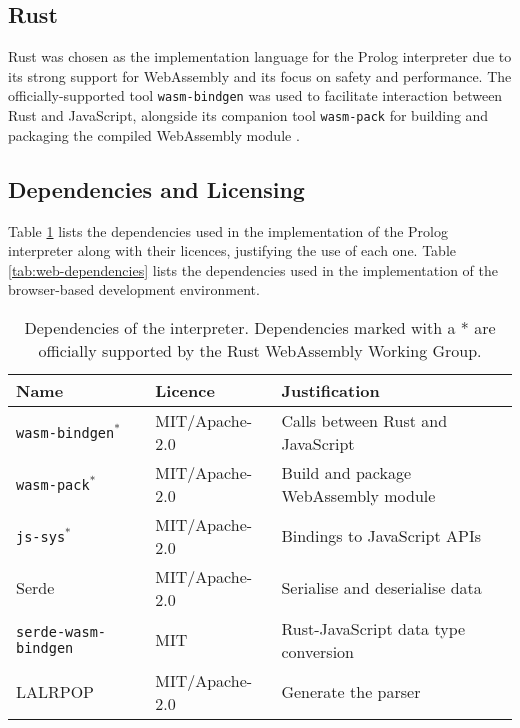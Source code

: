 \subsection{Rust}

\label{sec:rust}

Rust was chosen as the implementation language for the Prolog interpreter due to its strong support for WebAssembly and its focus on safety and performance. The officially-supported tool \texttt{wasm-bindgen} was used to facilitate interaction between Rust and JavaScript, alongside its companion tool \texttt{wasm-pack} for building and packaging the compiled WebAssembly module \cite{crichtonwasmbindgenhttpsgithubcom2014}.

\subsection{Dependencies and Licensing}

\label{sec:deps}

Table \ref{tab:core-dependencies} lists the dependencies used in the implementation of the Prolog interpreter along with their licences, justifying the use of each one. Table \ref{tab:web-dependencies} lists the dependencies used in the implementation of the browser-based development environment.

\begin{table}[H]
\centering
\begin{tabular}{lll}
\hline
\textbf{Name} & \textbf{Licence} & \textbf{Justification} \\
\hline
\texttt{wasm-bindgen}$^*$ & MIT/Apache-2.0 & Calls between Rust and JavaScript \\
\texttt{wasm-pack}$^*$ & MIT/Apache-2.0 & Build and package WebAssembly module \\
\texttt{js-sys}$^*$ & MIT/Apache-2.0 & Bindings to JavaScript APIs \\
Serde & MIT/Apache-2.0 & Serialise and deserialise data \\
\texttt{serde-wasm-bindgen} & MIT & Rust-JavaScript data type conversion \\
LALRPOP & MIT/Apache-2.0 & Generate the parser \\
\hline
\end{tabular}
\caption{Dependencies of the interpreter. Dependencies marked with a * are officially supported by the Rust WebAssembly Working Group.}
\label{tab:core-dependencies}
\end{table}

